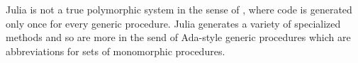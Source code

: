 Julia is not a true polymorphic system in the sense of \cite{Cardelli1985},
where code is generated only once for every generic procedure. Julia generates
a variety of specialized methods and so are more in the send of Ada-style
generic procedures which are abbreviations for sets of monomorphic procedures.



